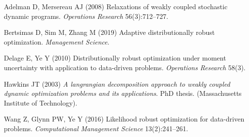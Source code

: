 \documentclass[
  a4paper,
,tablecaptionabove
]{scrartcl}
\numberwithin{equation}{section}
\newlength{\cslhangindent}
\newenvironment{cslreferences}%
  {\setlength{\parindent}{0pt}%
  \everypar{\setlength{\hangindent}{\cslhangindent}}\ignorespaces}%
  {\par}
\begin{document}
\hypertarget{sec:refs}{}
\begin{cslreferences}
  \leavevmode\hypertarget{sec:ref-adelman_relaxations_2008}{}%
  Adelman D, Mersereau AJ (2008) Relaxations of weakly coupled stochastic
  dynamic programs. \emph{Operations Research} 56(3):712--727.

  \leavevmode\hypertarget{sec:ref-bertsimas_adaptive_2019}{}%
  Bertsimas D, Sim M, Zhang M (2019) Adaptive distributionally robust
  optimization. \emph{Management Science}.

  \leavevmode\hypertarget{sec:ref-delage_distributionally_2010}{}%
  Delage E, Ye Y (2010) Distributionally robust optimization under moment
  uncertainty with application to data-driven problems. \emph{Operations
    Research} 58(3).

  \leavevmode\hypertarget{sec:ref-hawkins_langrangian_2003}{}%
  Hawkins JT (2003) \emph{A langrangian decomposition approach to weakly
    coupled dynamic optimization problems and its applications}. PhD thesis.
  (Massachusetts Institute of Technology).

  \leavevmode\hypertarget{sec:ref-wang_likelihood_2016}{}%
  Wang Z, Glynn PW, Ye Y (2016) Likelihood robust optimization for
  data-driven problems. \emph{Computational Management Science}
  13(2):241--261.
\end{cslreferences}
\end{document}
